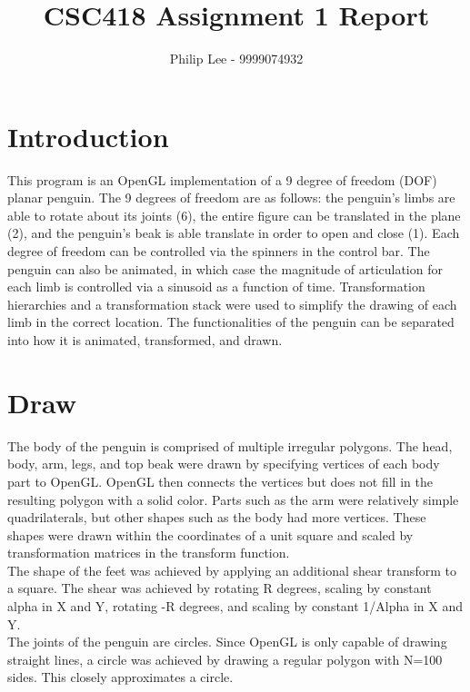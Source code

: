 \documentclass{scrartcl}
\title{CSC418 Assignment 1 Report}
\author{Philip Lee - 9999074932}
\begin{document}
\maketitle

\section{Introduction}


This program is an OpenGL implementation of a 9 degree of freedom (DOF) planar penguin. The 9 degrees of freedom are as follows: 
the penguin's limbs are able to rotate about its joints (6), the entire figure can be translated in the plane (2), 
and the penguin's beak is able translate in order to open and close (1). Each degree of freedom can be controlled via the spinners in the control bar.
The penguin can also be animated, in which case the magnitude of articulation for each limb is controlled via a sinusoid as a function of time.
Transformation hierarchies and a transformation stack were used to simplify the drawing of each limb in the correct location. 
The functionalities of the penguin can be separated into how it is animated, transformed, and drawn.

\section{Draw}


The body of the penguin is comprised of multiple irregular polygons. The head, body, arm, legs, and top beak were drawn by specifying vertices of each body part to OpenGL. 
OpenGL then connects the vertices but does not fill in the resulting polygon with a solid color. Parts such as the arm were relatively simple quadrilaterals, but 
other shapes such as the body had more vertices. These shapes were drawn within the coordinates of a unit square and scaled by transformation matrices in the transform function.\\

The shape of the feet was achieved by applying an additional shear transform to a square. The shear was achieved by rotating R degrees, scaling by constant alpha in X and Y, 
rotating -R degrees, and scaling by constant 1/Alpha in X and Y.\\

The joints of the penguin are circles. Since OpenGL is only capable of drawing straight lines, a circle was achieved by drawing a regular polygon with N=100 sides. This closely approximates a circle.\\
\end{document}

